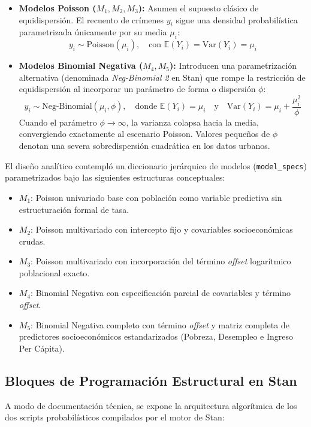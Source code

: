 \documentclass[11pt,a4paper]{article}
\begin{document}
\begin{itemize}
    \item \textbf{Modelos Poisson ($M_1, M_2, M_3$):} Asumen el supuesto clásico de equidispersión. El recuento de crímenes $y_i$ sigue una densidad probabilística parametrizada únicamente por su media $\mu_i$:
    \begin{equation}
        y_i \sim \text{Poisson}(\mu_i), \quad \text{con } \mathbb{E}(Y_i) = \text{Var}(Y_i) = \mu_i
    \end{equation}
    \item \textbf{Modelos Binomial Negativa ($M_4, M_5$):} Introducen una parametrización alternativa (denominada \textit{Neg-Binomial 2} en Stan) que rompe la restricción de equidispersión al incorporar un parámetro de forma o dispersión $\phi$:
    \begin{equation}
        y_i \sim \text{Neg-Binomial}(\mu_i, \phi), \quad \text{donde } \mathbb{E}(Y_i) = \mu_i \quad \text{y} \quad \text{Var}(Y_i) = \mu_i + \frac{\mu_i^2}{\phi}
    \end{equation}
    Cuando el parámetro $\phi \to \infty$, la varianza colapsa hacia la media, convergiendo exactamente al escenario Poisson. Valores pequeños de $\phi$ denotan una severa sobredispersión cuadrática en los datos urbanos.
\end{itemize}

El diseño analítico contempló un diccionario jerárquico de modelos (\texttt{model\_specs}) parametrizados bajo las siguientes estructuras conceptuales:
\begin{itemize}
    \item $M_1$: Poisson univariado base con población como variable predictiva sin estructuración formal de tasa.
    \item $M_2$: Poisson multivariado con intercepto fijo y covariables socioeconómicas crudas.
    \item $M_3$: Poisson multivariado con incorporación del término \textit{offset} logarítmico poblacional exacto.
    \item $M_4$: Binomial Negativa con especificación parcial de covariables y término \textit{offset}.
    \item $M_5$: Binomial Negativa completo con término \textit{offset} y matriz completa de predictores socioeconómicos estandarizados (Pobreza, Desempleo e Ingreso Per Cápita).
\end{itemize}

\subsection{Bloques de Programación Estructural en Stan}
A modo de documentación técnica, se expone la arquitectura algorítmica de los dos scripts probabilísticos compilados por el motor de Stan:
\end{document}
